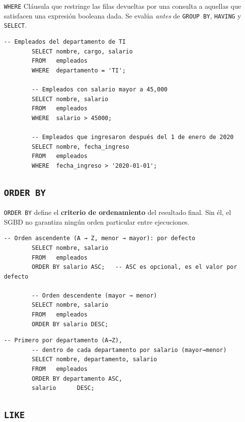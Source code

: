 \documentclass[12pt, a4paper]{article}
\begin{document}
	\begin{definicion}{\texttt{WHERE}}
		Cláusula que restringe las filas devueltas por una consulta a
		aquellas que satisfacen una expresión booleana dada.
		Se evalúa \textit{antes} de \texttt{GROUP BY}, \texttt{HAVING} y
		\texttt{SELECT}.
	\end{definicion}
	
	\begin{lstlisting}[caption={Filtros básicos con WHERE.}]
		-- Empleados del departamento de TI
		SELECT nombre, cargo, salario
		FROM   empleados
		WHERE  departamento = 'TI';
		
		-- Empleados con salario mayor a 45,000
		SELECT nombre, salario
		FROM   empleados
		WHERE  salario > 45000;
		
		-- Empleados que ingresaron después del 1 de enero de 2020
		SELECT nombre, fecha_ingreso
		FROM   empleados
		WHERE  fecha_ingreso > '2020-01-01';
	\end{lstlisting}
	
	\subsection{\texttt{ORDER BY}}
	
	\texttt{ORDER BY} define el \textbf{criterio de ordenamiento} del
	resultado final.
	Sin él, el SGBD no garantiza ningún orden particular entre
	ejecuciones.
	
	\begin{lstlisting}[caption={Orden ascendente y descendente.}]
		-- Orden ascendente (A → Z, menor → mayor): por defecto
		SELECT nombre, salario
		FROM   empleados
		ORDER BY salario ASC;   -- ASC es opcional, es el valor por defecto
		
		-- Orden descendente (mayor → menor)
		SELECT nombre, salario
		FROM   empleados
		ORDER BY salario DESC;
	\end{lstlisting}
	
	\begin{lstlisting}[caption={Ordenamiento compuesto por múltiples columnas.}]
		-- Primero por departamento (A→Z),
		-- dentro de cada departamento por salario (mayor→menor)
		SELECT nombre, departamento, salario
		FROM   empleados
		ORDER BY departamento ASC,
		salario      DESC;
	\end{lstlisting}
	
	\subsection{\texttt{LIKE}}
	
\end{document}

